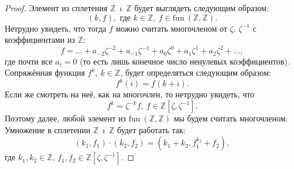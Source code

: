 \documentclass{article}
\begin{document}
\begin{proof}
    Элемент из сплетения $\mathbb{Z} \ \imath \ \mathbb{Z}$ будет выглядеть следующим образом:
     \[
        (k, f), \text{ где } k \in \mathbb{Z}, \ f \in \mathrm{fun} \ (\mathbb{Z}, \mathbb{Z}).
     \]
     Нетрудно увидеть, что тогда $f$ можно считать многочленом от $\zeta$, $\zeta^{-1}$ с коэффициентами из $\mathbb{Z}$:
     \[
        f = \ldots + a_{-2}\zeta^{-2} + a_{-1}\zeta^{-1} + a_{0}\zeta^{0} + a_{1}\zeta^{1} + a_{2}\zeta^{2} + \ldots,
     \]
     где почти все $a_i = 0$ (то есть лишь конечное число ненулевых коэффициентов). Сопряжённая функция $f^k, \ k \in \mathbb{Z}$, будет определяться следующим образом:
     \[
        f^k(i) = f(k + i).
     \]
     Если же смотреть на неё, как на многочлен, то нетрудно увидеть, что
     \[
        f^k = \zeta^{-k} f, \ f \in \mathbb{Z}[\zeta, \zeta^{-1}].
     \]
     Поэтому далее, любой элемент из $\mathrm{fun} \ (\mathbb{Z}, \mathbb{Z})$ мы будем считать многочленом.
     Умножение в сплетении $\mathbb{Z} \ \imath \ \mathbb{Z}$ будет работать так:
     \[
        (k_1, f_1) \cdot (k_2, f_2) = (k_1 + k_2, f_1^{k_2} + f_2),
     \]
     где $k_1, k_2 \in \mathbb{Z}$, $f_1, f_2 \in \mathbb{Z}[\zeta, \zeta^{-1}]$.
     

\end{proof}
\end{document}
